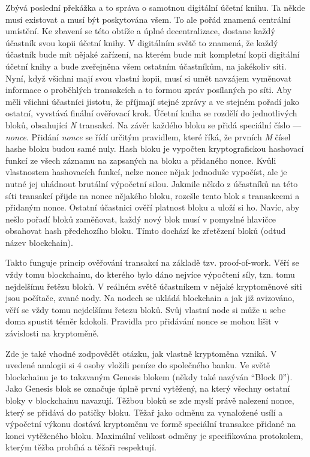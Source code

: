 Zbývá poslední překážka a to správa o samotnou digitální účetní knihu. Ta někde musí existovat a musí být poskytována všem. To ale pořád
znamená centrální umístění. Ke zbavení se této obtíže a úplné decentralizace, dostane každý účastník svou kopii účetní knihy. V digitálním světě
to znamená, že
každý účastník bude mít nějaké zařízení, na kterém bude mít kompletní kopii digitální účetní knihy a bude zveřejněna všem ostatním účastníkům,
na jakékoliv síti. Nyní, když všichni mají svou vlastní kopii, musí si umět navzájem vyměnovat informace o proběhlých transakcích a to formou
zpráv posílaných po síti. Aby měli všichni účastníci jistotu, že příjmají stejné zprávy a ve stejném pořadí jako ostatní, vyvstává finální
ověřovací krok. Účetní kniha se rozdělí do jednotlivých bloků, obsahující \emph{N} transakcí. Na závěr každého bloku se přidá speciální
číslo --- \emph{nonce}. Přidání \emph{nonce} se řídí určitým pravidlem, které říká, že prvních \emph{M} čísel hashe bloku budou samé nuly.
Hash bloku je vypočten kryptografickou hashovací funkcí ze všech záznamu na zapsaných na bloku a přidaného nonce. Kvůli vlastnostem hashovacích
funkcí, nelze nonce nějak jednoduše vypočíst, ale je nutné jej uhádnout brutální výpočetní silou. Jakmile někdo z účastníků na této síti
transakcí přijde na nonce nějakého bloku, rozešle tento blok s transakcemi a přidaným nonce. Ostatní účastnici ověří platnost bloku
a uloží si ho. Navíc, aby nešlo pořadí bloků zaměňovat, každý nový blok musí v pomyslné hlavičce obsahovat hash předchozího bloku.
Tímto dochází ke zřetězení bloků (odtud název blockchain).

Takto funguje princip ověřování transakcí na základě tzv. proof-of-work. Věří se vždy tomu blockchainu, do kterého bylo dáno nejvíce
výpočtení síly, tzn. tomu nejdelšímu řetězu bloků. V reálném světě účastníkem v nějaké kryptoměnové síti jsou počítače, zvané nody.
Na nodech se ukládá blockchain a jak již avizováno, věří se vždy tomu nejdelšímu řetezu bloků. Svůj vlastní node si může u sebe doma spustit
téměr kdokoli. Pravidla pro přidávání nonce se mohou lišit v závislosti na kryptoměně.

Zde je také vhodné zodpovědět otázku, jak vlastně kryptoměna vzniká. V uvedené analogii si 4 osoby vložili peníze do společného banku.
Ve světě blockchainu je to takzvaným Genesis blokem (někdy také nazýván \enquote{Block 0}). Jako Genesis blok se označuje úplně první
vytěžený, na který všechny ostatní bloky v blockchainu navazují. Těžbou bloků se zde myslí právě nalezení nonce, který se přidává do patičky
bloku. Těžař jako odměnu za vynaložené usílí a výpočetní výkonu dostává kryptoměnu ve formě speciální transakce přidané na konci vytěženého bloku.
Maximální velikost odměny je specifikována protokolem, kterým těžba probíhá a těžaři respektují.

